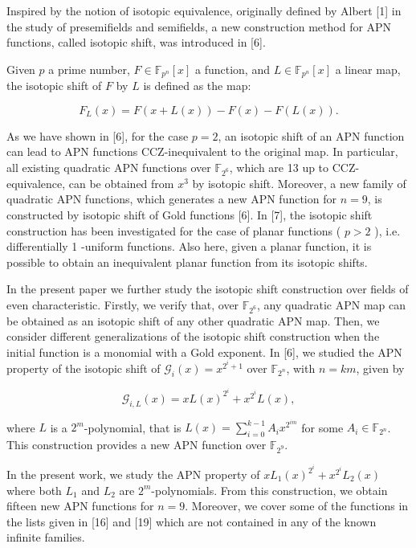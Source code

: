 \documentclass[10pt]{article}
\begin{document}
Inspired by the notion of isotopic equivalence, originally defined by Albert [1] in the study of presemifields and semifields, a new construction method for APN functions, called isotopic shift, was introduced in [6].

Given $p$ a prime number, $F \in \mathbb{F}_{p^{n}}[x]$ a function, and $L \in \mathbb{F}_{p^{n}}[x]$ a linear map, the isotopic shift of $F$ by $L$ is defined as the map:


\begin{equation*}
F_{L}(x)=F(x+L(x))-F(x)-F(L(x)) . \tag{1}
\end{equation*}


As we have shown in [6], for the case $p=2$, an isotopic shift of an APN function can lead to APN functions CCZ-inequivalent to the original map. In particular, all existing quadratic APN functions over $\mathbb{F}_{2^{6}}$, which are 13 up to CCZ-equivalence, can be obtained from $x^{3}$ by isotopic shift. Moreover, a new family of quadratic APN functions, which generates a new APN function for $n=9$, is constructed by isotopic shift of Gold functions [6]. In [7], the isotopic shift construction has been investigated for the case of planar functions ( $p>2$ ), i.e. differentially 1 -uniform functions. Also here, given a planar function, it is possible to obtain an inequivalent planar function from its isotopic shifts.

In the present paper we further study the isotopic shift construction over fields of even characteristic. Firstly, we verify that, over $\mathbb{F}_{2^{6}}$, any quadratic APN map can be obtained as an isotopic shift of any other quadratic APN map. Then, we consider different generalizations of the isotopic shift construction when the initial function is a monomial with a Gold exponent. In [6], we studied the APN property of the isotopic shift of $\mathscr{G}_{i}(x)=x^{2^{i}+1}$ over $\mathbb{F}_{2^{n}}$, with $n=k m$, given by


\begin{equation*}
\mathscr{G}_{i, L}(x)=x L(x)^{2^{i}}+x^{2^{i}} L(x), \tag{2}
\end{equation*}


where $L$ is a $2^{m}$-polynomial, that is $L(x)=\sum_{i=0}^{k-1} A_{i} x^{2^{i m}}$ for some $A_{i} \in \mathbb{F}_{2^{n}}$. This construction provides a new APN function over $\mathbb{F}_{2^{9}}$.

In the present work, we study the APN property of $x L_{1}(x)^{2^{i}}+x^{2^{i}} L_{2}(x)$ where both $L_{1}$ and $L_{2}$ are $2^{m}$-polynomials. From this construction, we obtain fifteen new APN functions for $n=9$. Moreover, we cover some of the functions in the lists given in [16] and [19] which are not contained in any of the known infinite families.
\end{document}
